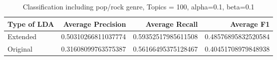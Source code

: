 \begin{table}[h]
\begin{subtable}[b]{0.5\textwidth}
\begin{tabular}{|l|r|r|r|}

\hline
\textbf{Type of LDA} &  \textbf{Average Precision} & \textbf{Average Recall} & \textbf{Average F1} \\
\hline
Extended &0.50310266811037774 & 0.59352517985611508 & 0.48576895832520584 \\
Original & 0.31608099763575387 & 0.56166495375128467 & 0.40451708979848938 \\
\hline
\end{tabular}
\caption{Classification including pop/rock genre, Topics = 100, alpha=0.1, beta=0.1}
\end{subtable}
\end{table}